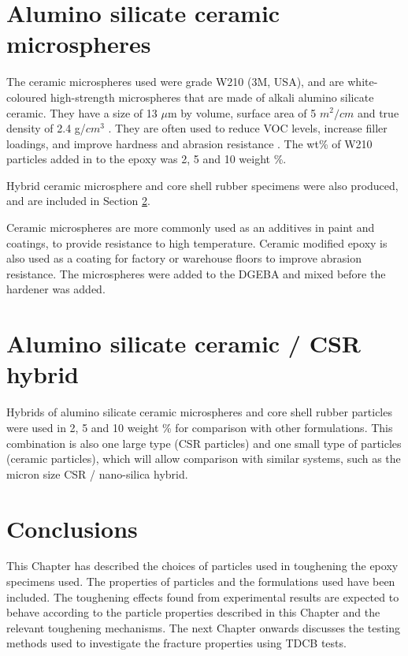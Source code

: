 \documentclass[numbers=noendperiod,chapterprefix=on]{icldt} %
\begin{document}
\section{Alumino silicate ceramic microspheres}
The ceramic microspheres used were grade W210 (3M, USA), and are white-coloured high-strength microspheres that are made of alkali alumino silicate ceramic. They have a size of 13 $\mu$m by volume, surface area of 5 $m^{2}/cm$ and true density of 2.4 g/${cm}^{3}$ \cite{3M}. They are often used to reduce VOC levels, increase filler loadings, and improve hardness and abrasion resistance \cite{3M2015}.
The wt\% of W210 particles added in to the epoxy was 2, 5 and 10 weight \%.

Hybrid ceramic microsphere and core shell rubber specimens were also produced, and are included in Section \ref{Alumino silicate Ceramic/ CSR Hybrid}.

Ceramic microspheres are more commonly used as an additives in paint and coatings, to provide resistance to high temperature. Ceramic modified epoxy is also used as a coating for factory or warehouse floors to improve abrasion resistance. The microspheres were added to the DGEBA and mixed before the hardener was added. 



\section{Alumino silicate ceramic / CSR hybrid} \label{Alumino silicate Ceramic/ CSR Hybrid}
Hybrids of alumino silicate ceramic microspheres and core shell rubber particles were used in 2, 5 and 10 weight \% for comparison with other formulations. This combination is also one large type (CSR particles) and one small type of particles (ceramic particles), which will allow comparison with similar systems, such as the micron size CSR / nano-silica hybrid.

\section{Conclusions}
This Chapter has described the choices of particles used in toughening the epoxy specimens used. The properties of particles and the formulations used have been included. The toughening effects found from experimental results are expected to behave according to the particle properties described in this Chapter and the relevant toughening mechanisms. The next Chapter onwards discusses the testing methods used to investigate the fracture properties using TDCB tests. 
\end{document}
